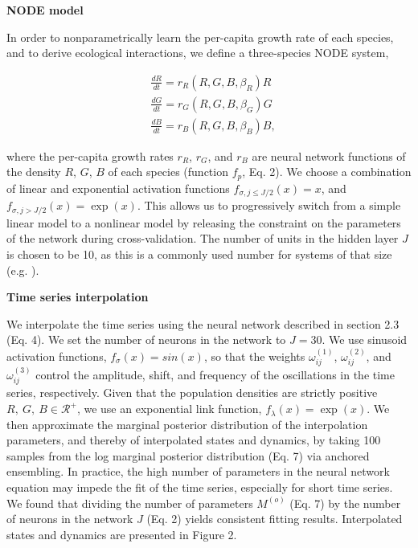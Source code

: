 \documentclass[11pt, oneside]{article}
\begin{document}
\textbf{NODE model}

In order to nonparametrically learn the per-capita growth rate of each species, and to derive ecological interactions, we define a three-species NODE system,

\vspace{-0.5cm}
\begin{equation} \begin{aligned}
	& \frac{dR}{dt} = r_R(R,G,B,\beta_R) R \\
	& \frac{dG}{dt} = r_G(R,G,B,\beta_G) G \\
	& \frac{dB}{dt} = r_B(R,G,B,\beta_B) B,
\end{aligned} \end{equation}

where the per-capita growth rates $r_R$, $r_G$, and $r_B$ are neural network functions of the density $R$, $G$, $B$ of each species (function $f_p$, Eq. 2).
We choose a combination of linear and exponential activation functions $f_{\sigma, j\leq J/2}(x) = x$, and $f_{\sigma, j>J/2}(x) = \exp(x)$.
This allows us to progressively switch from a simple linear model to a nonlinear model by releasing the constraint on the parameters of the network during cross-validation.
The number of units in the hidden layer $J$ is chosen to be 10, as this is a commonly used number for systems of that size (e.g. \cite{Wu2005,Bonnaffe2021a}). 

\textbf{Time series interpolation}

We interpolate the time series using the neural network described in section 2.3 (Eq. 4).
We set the number of neurons in the network to $J=30$.
We use sinusoid activation functions, $f_\sigma(x) = sin(x)$, so that the weights $\omega^{(1)}_{ij}$, $\omega^{(2)}_{ij}$, and $\omega^{(3)}_{ij}$ control the amplitude, shift, and frequency of the oscillations in the time series, respectively.
Given that the population densities are strictly positive $R,~G,~B \in \mathcal{R^{+}}$, we use an exponential link function, $f_\lambda(x) = \exp (x)$. 
We then approximate the marginal posterior distribution of the interpolation parameters, and thereby of interpolated states and dynamics, by taking 100 samples from the log marginal posterior distribution (Eq. 7) via anchored ensembling. %
In practice, the high number of parameters in the neural network equation may impede the fit of the time series, especially for short time series. 
We found that dividing the number of parameters $M^{(o)}$ (Eq. 7) by the number of neurons in the network $J$ (Eq. 2) yields consistent fitting results.
Interpolated states and dynamics are presented in Figure 2.
\end{document}
